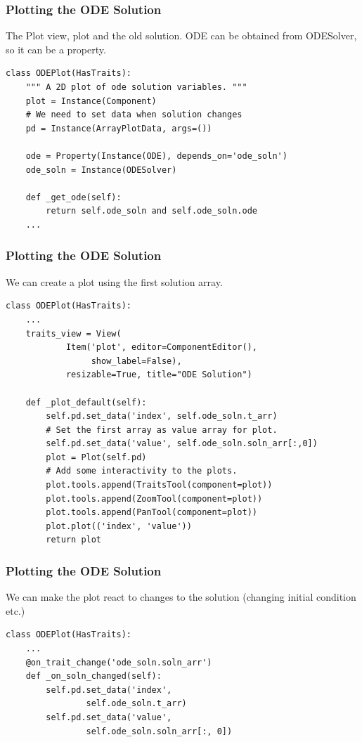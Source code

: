 \documentclass[14pt,compress]{beamer}
\begin{document}
\begin{frame}
\frametitle{Plotting the ODE Solution}

The Plot view, plot and the old solution. ODE can be obtained from ODESolver,
so it can be a property.

\footnotesize
\begin{lstlisting}
class ODEPlot(HasTraits):
    """ A 2D plot of ode solution variables. """
    plot = Instance(Component)
    # We need to set data when solution changes
    pd = Instance(ArrayPlotData, args=())

    ode = Property(Instance(ODE), depends_on='ode_soln')
    ode_soln = Instance(ODESolver)

    def _get_ode(self):
        return self.ode_soln and self.ode_soln.ode
    ...
\end{lstlisting}
\end{frame}

\begin{frame}
\frametitle{Plotting the ODE Solution}
\footnotesize
We can create a plot using the first solution array.
\begin{lstlisting}
class ODEPlot(HasTraits):
    ...
    traits_view = View(
            Item('plot', editor=ComponentEditor(),
                 show_label=False),
            resizable=True, title="ODE Solution")

    def _plot_default(self):
        self.pd.set_data('index', self.ode_soln.t_arr)
        # Set the first array as value array for plot.
        self.pd.set_data('value', self.ode_soln.soln_arr[:,0])
        plot = Plot(self.pd)
        # Add some interactivity to the plots.
        plot.tools.append(TraitsTool(component=plot))
        plot.tools.append(ZoomTool(component=plot))
        plot.tools.append(PanTool(component=plot))
        plot.plot(('index', 'value'))
        return plot
\end{lstlisting}
\end{frame}

\begin{frame}
\frametitle{Plotting the ODE Solution}
We can make the plot react to changes to the solution
(changing initial condition etc.)
\footnotesize
\begin{lstlisting}
class ODEPlot(HasTraits):
    ...
    @on_trait_change('ode_soln.soln_arr')
    def _on_soln_changed(self):
        self.pd.set_data('index', 
                self.ode_soln.t_arr)
        self.pd.set_data('value', 
                self.ode_soln.soln_arr[:, 0])
\end{lstlisting}
\end{frame}
\end{document}
